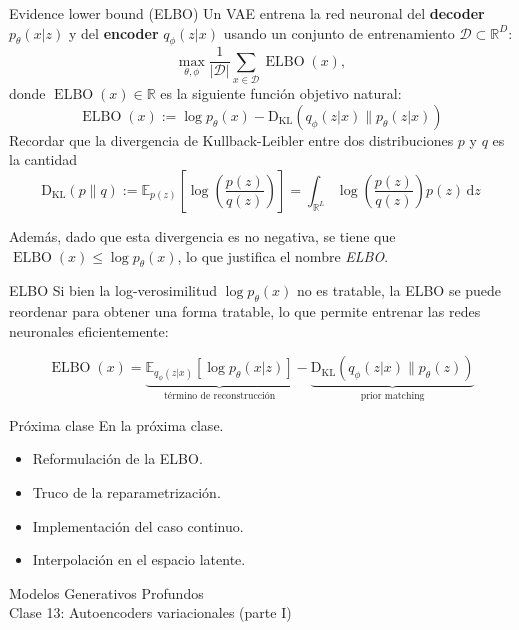 \documentclass{beamer}
\newcommand{\R}{\mathbb{R}}
\begin{document}
\begin{frame}{Evidence lower bound (ELBO)}
    Un VAE entrena la red neuronal del \textbf{decoder} $p_\theta(x|z)$ y del \textbf{encoder} $q_\phi(z|x)$ usando un conjunto de entrenamiento $\mathcal{D}\subset\R^D$:
    \begin{equation*}
        \max_{\theta,\phi} \frac{1}{|\mathcal{D}|}\sum_{x\in\mathcal{D}} \operatorname{ELBO}(x),
    \end{equation*}
    donde $\operatorname{ELBO}(x)\in\R$ es la siguiente función objetivo natural:
    \begin{equation*}
        \operatorname{ELBO}(x):=\log p_\theta(x)-\operatorname{{D}_{KL}}\left(q_\phi(z|x)\| p_\theta(z|x)\right)
    \end{equation*}
    Recordar que la divergencia de Kullback-Leibler entre dos distribuciones $p$ y $q$ es la cantidad
    \begin{equation*}
        \operatorname{D_{KL}}(p\|q):=\mathbb{E}_{p(z)}\left[\log\left(\frac{p(z)}{q(z)}\right)\right]
        = \int_{\R^L} \log\left(\frac{p(z)}{q(z)}\right)p(z)\,\text{d}z
    \end{equation*}

    Además, dado que esta divergencia es no negativa, se tiene que $\operatorname{ELBO}(x)\leq \log p_\theta(x)$, lo que justifica el nombre \textit{ELBO}.
\end{frame}

\begin{frame}{ELBO}
    Si bien la log-verosimilitud $\log p_\theta(x)$ no es tratable, la ELBO se puede reordenar para obtener una forma tratable, lo que permite entrenar las redes neuronales eficientemente:

    \begin{equation*}
        \operatorname{ELBO}(x) = \underbrace{\mathbb{E}_{q_\phi(z|x)}\left[\log p_\theta(x|z)\right]}_{\text{término de reconstrucción}} - \underbrace{\operatorname{{D}_{KL}}\left(q_\phi(z|x)\| p_\theta(z)\right)}_{\text{prior matching}}
    \end{equation*}


\end{frame}

\begin{frame}{Próxima clase}
    En la próxima clase.
    \begin{itemize}
        \item Reformulación de la ELBO.
        \item Truco de la reparametrización.
        \item Implementación del caso continuo.
        \item Interpolación en el espacio latente.
    \end{itemize}
\end{frame}

\begin{frame}
    \centering
    \Large{Modelos Generativos Profundos}\\
    \large{Clase 13: Autoencoders variacionales (parte I)}
\end{frame}
\end{document}
